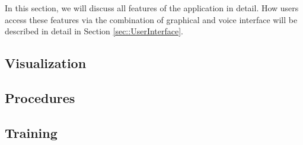 In this section, we will discuss all features of the application in detail.
How users access these features via the combination of graphical and voice interface will be described in detail in Section \ref{sec::UserInterface}.

\subsection{\label{sec::ImplementationVisualization}Visualization}

\subsection{\label{sec::ImplementationProcedures}Procedures}

\subsection{\label{sec::ImplementationTraining}Training}
